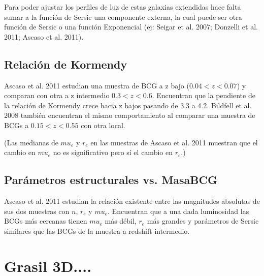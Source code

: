 Para poder ajustar los perfiles de luz de estas galaxias extendidas hace falta sumar a la funci\'on de Sersic una componente externa, la cual puede ser otra funci\'on de Sersic o una funci\'on Exponencial (ej: Seigar et al. 2007; Donzelli et al. 2011; Ascaso et al. 2011). 

\subsection{Relaci\'on de Kormendy}
Ascaso et al. 2011 estudian una muestra de BCG a z bajo ($0.04<z<0.07$) y comparan con otra a z intermedio $0.3<z<0.6$. Encuentran que la pendiente de la relaci\'on de Kormendy crece hacia z bajos pasando de 3.3 a 4.2. Bildfell et al. 2008 tambi\'en encuentran el mismo comportamiento al comparar una muestra de BCGs a $0.15<z<0.55$  con otra local.

(Las medianas de $mu_e$ y $r_e$ en las muestras de Ascaso et al. 2011 muestran que el cambio en $mu_e$ no es significativo pero s\'i el cambio en $r_e$.)

\subsection{Par\'ametros estructurales vs. MasaBCG}
Ascaso et al. 2011 estudian  la relaci\'on existente entre las magnitudes absolutas de sus dos muestras con $n$, $r_e$ y $mu_e$. Encuentran que a una dada luminosidad las BCGs m\'as cercanas tienen $mu_e$ m\'as d\'ebil, $r_e$ m\'as grandes y par\'ametros de Sersic similares que las BCGs de la muestra a redshift intermedio.


 \section{Grasil 3D.... }


